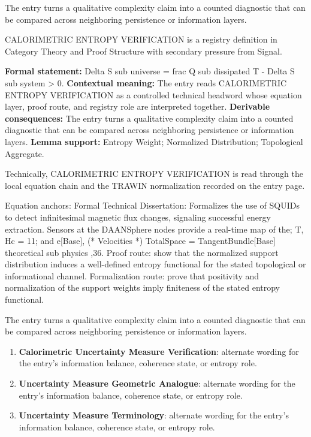 The entry turns a qualitative complexity claim into a counted diagnostic that can be compared across neighboring persistence or information layers.
\clearpage


\begingroup\small
{}
CALORIMETRIC ENTROPY VERIFICATION is a registry definition in Category Theory and Proof Structure with secondary pressure from Signal.

\begingroup\footnotesize\setlength{\emergencystretch}{3em}\sloppy
\textbf{Formal statement:} Delta S sub universe = frac Q sub dissipated T - Delta S sub system > 0. \textbf{Contextual meaning:} The entry reads CALORIMETRIC ENTROPY VERIFICATION as a controlled technical headword whose equation layer, proof route, and registry role are interpreted together. \textbf{Derivable consequences:} The entry turns a qualitative complexity claim into a counted diagnostic that can be compared across neighboring persistence or information layers. \textbf{Lemma support:} Entropy Weight; Normalized Distribution; Topological Aggregate.\par
\endgroup

Technically, CALORIMETRIC ENTROPY VERIFICATION is read through the local equation chain and the TRAWIN normalization recorded on the entry page.

Equation anchors: Formal Technical Dissertation: Formalizes the use of SQUIDs to detect infinitesimal magnetic flux changes, signaling successful energy extraction. Sensors at the DAANSphere nodes provide a real-time map of the; T, Hc = 11; and e[Base], (* Velocities *) TotalSpace = TangentBundle[Base] theoretical sub physics ,36. Proof route: show that the normalized support distribution induces a well-defined entropy functional for the stated topological or informational channel. Formalization route: prove that positivity and normalization of the support weights imply finiteness of the stated entropy functional.

The entry turns a qualitative complexity claim into a counted diagnostic that can be compared across neighboring persistence or information layers.
\endgroup

\begin{enumerate}[leftmargin=1.6em,itemsep=6pt,topsep=4pt]
\item \textbf{Calorimetric Uncertainty Measure Verification}: alternate wording for the entry's information balance, coherence state, or entropy role.
\item \textbf{Uncertainty Measure Geometric Analogue}: alternate wording for the entry's information balance, coherence state, or entropy role.
\item \textbf{Uncertainty Measure Terminology}: alternate wording for the entry's information balance, coherence state, or entropy role.
\end{enumerate}

